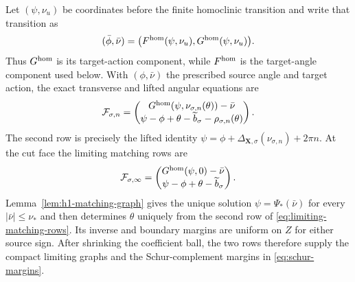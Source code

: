 \documentclass[11pt]{amsart}
\numberwithin{equation}{section}
\theoremstyle{definition}
\theoremstyle{remark}
\begin{document}
Let $(\psi,\nu_u)$ be coordinates before the finite homoclinic transition
and write that transition as
\begin{equation}\label{eq:finite-homoclinic-map}
 (\bar\phi,\bar\nu)
   =\bigl(F^{\rm hom}(\psi,\nu_u),G^{\rm hom}(\psi,\nu_u)\bigr).
\end{equation}
Thus $G^{\rm hom}$ is its target-action component, while $F^{\rm hom}$ is
the target-angle component used below.  With $(\phi,\bar\nu)$ the
prescribed source angle and target action, the exact transverse and lifted
angular equations are
\begin{equation}\label{eq:exact-matching-rows}
 \mathcal F_{\sigma,n}
 =\begin{pmatrix}
   G^{\rm hom}(\psi,\nu_{\sigma,n}(\theta))-\bar\nu\\
   \psi-\phi+\theta-\widetilde b_\sigma
      -\rho_{\sigma,n}(\theta)
  \end{pmatrix}.
\end{equation}
The second row is precisely the lifted identity
$\psi=\phi+\Delta_{\mathbf X,\sigma}(\nu_{\sigma,n})+2\pi n$.
At the cut face the limiting matching rows are
\begin{equation}\label{eq:limiting-matching-rows}
 \mathcal F_{\sigma,\infty}
 =\begin{pmatrix}
   G^{\rm hom}(\psi,0)-\bar\nu\\
   \psi-\phi+\theta-\widetilde b_\sigma
  \end{pmatrix}.
\end{equation}
Lemma~\ref{lem:h1-matching-graph} gives the unique solution
$\psi=\Psi_*(\bar\nu)$ for every $|\bar\nu|\le\nu_*$ and then determines
$\theta$ uniquely from the second row of
\eqref{eq:limiting-matching-rows}.  Its inverse and boundary margins are
uniform on $Z$ for either source sign.
After shrinking the coefficient ball, the two rows therefore supply the
compact limiting graphs and the Schur-complement margins in
\eqref{eq:schur-margins}.
\end{document}
